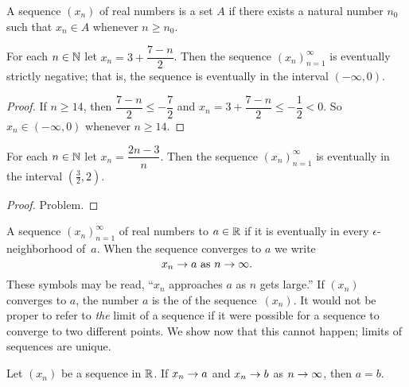 \begin{defn} A sequence $(x_n)$ of real numbers is
 a set $A$ if there exists a natural number $n_0$ such that $x_n \in A$
whenever $n \ge n_0$.
\end{defn}

\begin{exam} For each $n \in \mathbb{N}$ let $x_n = 3 + \dfrac{7-n}2$.  Then the sequence
$(x_n)_{n=1}^\infty$ is eventually strictly negative; that is, the sequence is eventually in
the interval $(-\infty,0)$.
\end{exam}

\begin{proof} If $n \ge 14$, then $\dfrac{7-n}2 \le -\dfrac72$ and $x_n = 3 + \dfrac{7-n}2
\le -\dfrac12 < 0$.  So $x_n \in (-\infty,0)$ whenever $n \ge 14$.
\end{proof}

\begin{exam} For each $n \in \mathbb{N}$ let $x_n = \dfrac{2n-3}n$.  Then the sequence $(x_n)_{n=1}^\infty$
is eventually in the interval $(\frac32,2)$.
\end{exam}

\begin{proof} Problem. \ns \end{proof}

\begin{defn}\label{df_conv_seq} A sequence $(x_n)_{n=1}^\infty$ of real numbers
 to $a \in \mathbb{R}$ if it is eventually in every $\epsilon$-neighborhood of~$a$. When
the sequence converges to $a$ we write
 \begin{equation}\label{xn_to_a} x_n \rightarrow a \text{ as $n \rightarrow \infty$.}
 \end{equation}
These symbols may be read, ``$x_n$ approaches $a$ as $n$ gets large.''  If $(x_n)$ converges
to $a$, the number $a$ is the
 of the sequence~$(x_n)$.  It would not be proper to refer to \emph{the} limit of a
sequence if it were possible for a sequence to converge to two different points.  We show now
that this cannot happen; limits of sequences are unique.
\end{defn}

\begin{prop} Let $(x_n)$ be a sequence in $\mathbb{R}$.  If $x_n \rightarrow a$ and $x_n \rightarrow b$ as $n \rightarrow \infty$,
then $a=b$.
\end{prop}


